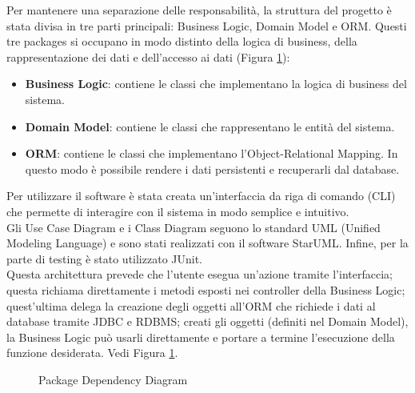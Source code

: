 \documentclass{article}
\begin{document}
\noindent Per mantenere una separazione delle responsabilità, la struttura del progetto è stata divisa in tre parti principali: Business Logic, Domain Model e ORM. Questi tre packages si occupano in modo distinto della logica di business, della rappresentazione dei dati e dell’accesso ai dati (Figura \ref{fig:diagram_packagedependency}):
\begin{itemize}
    \item \textbf{Business Logic}: contiene le classi che implementano la logica di business del sistema.
    \item \textbf{Domain Model}: contiene le classi che rappresentano le entità del sistema.
    \item \textbf{ORM}: contiene le classi che implementano l’Object-Relational Mapping. In questo modo è possibile rendere i dati persistenti e recuperarli dal database.
\end{itemize}
Per utilizzare il software è stata creata un’interfaccia da riga di comando (CLI) che permette di interagire con il sistema in modo semplice e intuitivo.
\\

\noindent Gli Use Case Diagram e i Class Diagram seguono lo standard UML (Unified Modeling Language) e sono stati realizzati con il software StarUML. Infine, per la parte di testing è stato utilizzato JUnit.
\\

\noindent Questa architettura prevede che l'utente esegua un'azione tramite l'interfaccia; questa richiama direttamente i metodi esposti nei controller della Business Logic; quest'ultima delega la creazione degli oggetti all'ORM che richiede i dati al database tramite JDBC e RDBMS; creati gli oggetti (definiti nel Domain Model), la Business Logic può usarli direttamente e portare a termine l'esecuzione della funzione desiderata. Vedi Figura \ref{fig:diagram_packagedependency}.

\begin{figure}[H]
    \centering
    \caption{Package Dependency Diagram}
    \label{fig:diagram_packagedependency}
\end{figure}
\end{document}
